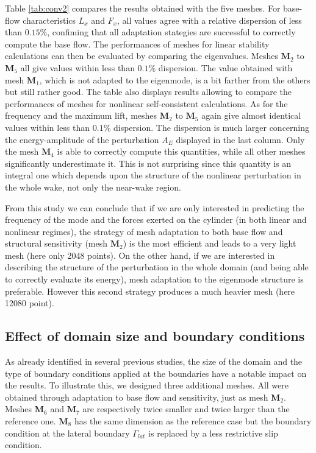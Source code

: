 \documentclass[twocolumn,10pt]{asme2ej}
\begin{document}
Table  \ref{tab:conv2} compares the results obtained with the five meshes. For base-flow characteristics $L_x$ and $F_x$, all values agree with a relative dispersion of less than $0.15\%$, confiming that all adaptation stategies are successful to correctly compute the base flow. 
The performances of meshes for linear stability calculations can then be evaluated by comparing the eigenvalues. Meshes $\mathbf{M}_2$ to $\mathbf{M}_5$ all give values within less than $0.1\%$ dispersion. The value obtained with mesh  $\mathbf{M}_1$, which is not adapted to the eigenmode, is a bit farther from the others but still rather good. The table also displays results allowing to compare the performances of meshes for nonlinear self-consistent calculations. As for the frequency and the maximum lift, meshes $\mathbf{M}_2$ to $\mathbf{M}_5$ again give almost identical values within less than $0.1\%$ dispersion. The dispersion is much larger concerning the energy-amplitude of the perturbation $A_E$ displayed in the last column. Only the mesh $\mathbf{M}_4$ is able to correctly compute this quantities, while all other meshes significantly underestimate it. This is not surprising since this quantity is an integral one which depends upon the structure of the nonlinear perturbation in the whole wake, not only the near-wake region.

From this study we can conclude that if we are only interested in predicting the frequency of the mode and the forces exerted on the cylinder (in both linear and nonlinear regimes), the strategy of mesh adaptation to both base flow and structural sensitivity (mesh $\mathbf{M}_2$) is the most efficient and leads to a very light mesh (here only 2048 points). On the other hand, if we are interested in describing the structure of the perturbation in the whole domain (and being able to correctly evaluate its energy), mesh adaptation to the eigenmode structure is preferable. However this second strategy produces a much heavier mesh (here 12080 point).
 
\subsection{Effect of domain size and boundary conditions}

As already identified in several previous studies, the size of the domain and the type of boundary conditions applied at the boundaries have a notable impact on the results. To illustrate this, we designed three additional meshes. All were obtained through adaptation to base flow and sensitivity, just as mesh $\mathbf{M}_2$.
Meshes $\mathbf{M}_6$ and $\mathbf{M}_7$ are respectively twice smaller and twice larger than the reference one. 
 $\mathbf{M}_8$ has the same dimension as the reference case but the boundary condition at the lateral boundary $\Gamma_{lat}$ is replaced by a less restrictive slip condition. 
\end{document}

